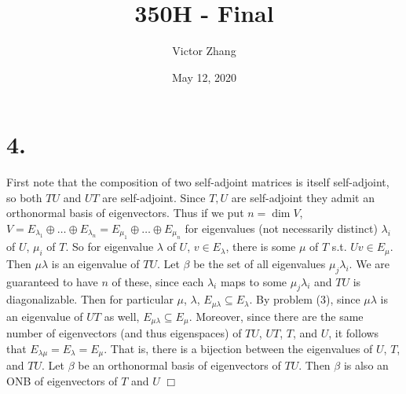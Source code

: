 \documentclass{article}
\title{350H - Final}
\author{Victor Zhang}
\date{May 12, 2020}
\begin{document}
\maketitle

\section*{4.}
First note that the composition of two self-adjoint matrices is itself self-adjoint, so both $TU$ and $UT$ are self-adjoint. Since $T,U$ are self-adjoint they admit an orthonormal basis of eigenvectors. Thus if we put $n = \dim V$, $V = E_{\lambda_1} \oplus \dots \oplus E_{\lambda_n} = E_{\mu_1} \oplus \dots \oplus E_{\mu_n}$ for eigenvalues (not necessarily distinct) $\lambda_i$ of $U$, $\mu_i$ of $T$. So for eigenvalue $\lambda$ of $U$, $v \in E_\lambda$, there is some $\mu$ of $T$ s.t. $Uv \in E_\mu$. Then $\mu\lambda$ is an eigenvalue of $TU$. Let $\beta$ be the set of all eigenvalues $\mu_j\lambda_i$. We are guaranteed to have $n$ of these, since each $\lambda_i$ maps to some $\mu_j\lambda_i$ and $TU$ is diagonalizable. Then for particular $\mu$, $\lambda$, $E_{\mu\lambda} \subseteq E_\lambda$. By problem (3), since $\mu\lambda$ is an eigenvalue of $UT$ as well, $E_{\mu\lambda} \subseteq E_\mu$. Moreover, since there are the same number of eigenvectors (and thus eigenspaces) of $TU$, $UT$, $T$, and $U$, it follows that $E_{\lambda\mu} = E_\lambda = E_\mu$. That is, there is a bijection between the eigenvalues of $U$, $T$, and $TU$. Let $\beta$ be an orthonormal basis of eigenvectors of $TU$. Then $\beta$ is also an ONB of eigenvectors of $T$ and $U$ $\Box$
\end{document}
